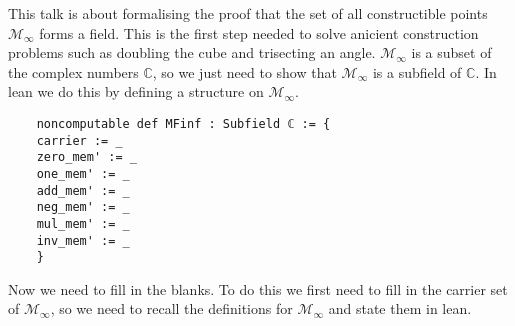This talk is about formalising the proof that the set of all constructible points $\mathcal{M}_{\infty}$ forms a field. 
This is the first step needed to solve anicient construction problems such as doubling the cube and trisecting an angle. 
$\mathcal{M}_{\infty}$ is a subset of the complex numbers $\mathbb{C}$, so we just need to show that $\mathcal{M}_{\infty}$ is a subfield of $\mathbb{C}$. 
In lean we do this by defining a structure on $\mathcal{M}_{\infty}$.

\begin{lstlisting}
    noncomputable def MFinf : Subfield ℂ := {
    carrier := _
    zero_mem' := _
    one_mem' := _
    add_mem' := _
    neg_mem' := _
    mul_mem' := _
    inv_mem' := _
    }
\end{lstlisting}

Now we need to fill in the blanks. To do this we first need to fill in the carrier set of $\mathcal{M}_{\infty}$, 
so we need to recall the definitions for $\mathcal{M}_{\infty}$ and state them in lean.
